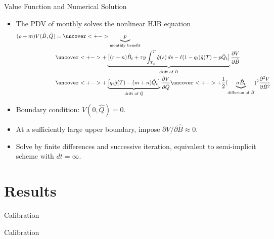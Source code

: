 \documentclass[11pt, aspectratio=169]{beamer}
\begin{document}
\begin{frame}[label=numerical-solution]{Value Function and Numerical Solution}
    \begin{itemize}[<+->]
        \item The PDV of monthly solves the nonlinear HJB equation
        \begin{equation*}
            \begin{split}
                (\rho+m)V(\hat{B}, \hat{Q})&=\uncover<+->{\underbrace{p}_{\text{monthly benefit}}}\\ 
                &\uncover<+->{+\underbrace{\big[(r-n)\hat B_t
                +\tau y\int_{T_w}^{T}\hat g(s)\,ds
                -\ell(1-q_t)\hat g(T)
                -p\hat Q_t\big]}_{\text{drift of $\hat{B}$}}\pd{V}{\hat{B}}} \\ 
                &\uncover<+->{+\underbrace{\big[q_t\hat g(T)-(m+n)\hat Q_t\big]}_{\text{drift of $\hat{Q}$}}\pd{V}{\hat{Q}}}
                \uncover<+->{+ \frac{1}{2}(\underbrace{\sigma \hat{B}_t}_{\text{diffusion of $\hat{B}$}})^2\pdd{V}{\hat{B}}}
            \end{split}
        \end{equation*}
        \item Boundary condition: $V(0, \hat{Q}) = 0$. 
        \item At a sufficiently large upper boundary, impose
        $\partial V/\partial\hat B\approx0$.
        \item Solve by finite differences and successive iteration, 
        equivalent to semi-implicit scheme with $dt = \infty$. 
        \hyperlink{numerical-algorithm}{%
        }
    \end{itemize}
\end{frame}

\section{Results}

\begin{frame}{Calibration}
    \footnotesize
    \setlength{\tabcolsep}{3pt}
    \renewcommand{\arraystretch}{0.92}
    \begin{table}[t]
        
    \end{table}
\end{frame}

\begin{frame}{Calibration}
    \footnotesize
    \setlength{\tabcolsep}{3pt}
    \renewcommand{\arraystretch}{1.05}
    \begin{table}[t]
        
    \end{table}
\end{frame}
\end{document}
